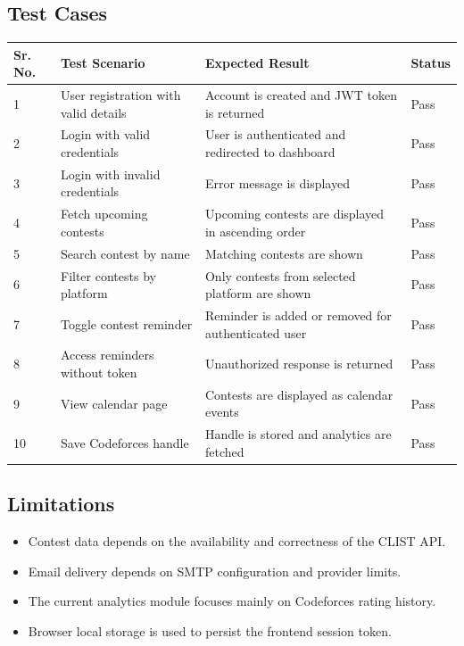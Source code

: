 \documentclass[12pt,a4paper]{report}
\begin{document}
\chapter{}
\begin{normalsize}

\section{Test Cases}

\begin{center}
\begin{tabular}{|p{1.2cm}|p{4cm}|p{4.5cm}|p{3.2cm}|}
\hline
\textbf{Sr. No.} & \textbf{Test Scenario} & \textbf{Expected Result} & \textbf{Status} \\
\hline
1 & User registration with valid details & Account is created and JWT token is returned & Pass \\
\hline
2 & Login with valid credentials & User is authenticated and redirected to dashboard & Pass \\
\hline
3 & Login with invalid credentials & Error message is displayed & Pass \\
\hline
4 & Fetch upcoming contests & Upcoming contests are displayed in ascending order & Pass \\
\hline
5 & Search contest by name & Matching contests are shown & Pass \\
\hline
6 & Filter contests by platform & Only contests from selected platform are shown & Pass \\
\hline
7 & Toggle contest reminder & Reminder is added or removed for authenticated user & Pass \\
\hline
8 & Access reminders without token & Unauthorized response is returned & Pass \\
\hline
9 & View calendar page & Contests are displayed as calendar events & Pass \\
\hline
10 & Save Codeforces handle & Handle is stored and analytics are fetched & Pass \\
\hline
\end{tabular}
\end{center}

\section{Limitations}

\begin{itemize}
    \item Contest data depends on the availability and correctness of the CLIST API.
    \item Email delivery depends on SMTP configuration and provider limits.
    \item The current analytics module focuses mainly on Codeforces rating history.
    \item Browser local storage is used to persist the frontend session token.
\end{itemize}

\end{normalsize}
\end{document}
